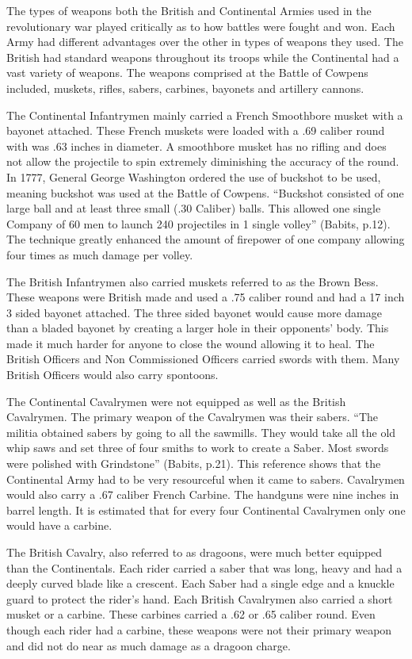 The types of weapons both the British and Continental Armies used in the
revolutionary war played critically as to how battles were fought and won.  Each
Army had different advantages over the other in types of weapons they used.  The
British had standard weapons throughout its troops while the Continental had a
vast variety of weapons. The weapons comprised at the Battle of Cowpens
included, muskets, rifles, sabers, carbines, bayonets and artillery cannons.  

The Continental Infantrymen mainly carried a French Smoothbore musket with a
bayonet attached.  These French muskets were loaded with a .69 caliber round
with was .63 inches in diameter.  A smoothbore musket has no rifling and does
not allow the projectile to spin extremely diminishing the accuracy of the
round.  In 1777, General George Washington ordered the use of buckshot to be
used, meaning buckshot was used at the Battle of Cowpens.  “Buckshot consisted
of one large ball and at least three small (.30 Caliber) balls.  This allowed
one single Company of 60 men to launch 240 projectiles in 1 single volley”
(Babits, p.12).  The technique greatly enhanced the amount of firepower of one
company allowing four times as much damage per volley.

The British Infantrymen also carried muskets referred to as the Brown Bess.
These weapons were British made and used a .75 caliber round and had a 17 inch 3
sided bayonet attached.  The three sided bayonet would cause more damage than a
bladed bayonet by creating a larger hole in their opponents’ body.  This made it
much harder for anyone to close the wound allowing it to heal.  The British
Officers and Non Commissioned Officers carried swords with them.  Many British
Officers would also carry spontoons.

The Continental Cavalrymen were not equipped as well as the British Cavalrymen.
The primary weapon of the Cavalrymen was their sabers.  “The militia obtained
sabers by going to all the sawmills.  They would take all the old whip saws and
set three of four smiths to work to create a Saber.  Most swords were polished
with Grindstone” (Babits, p.21).  This reference shows that the Continental Army
had to be very resourceful when it came to sabers.  Cavalrymen would also carry
a .67 caliber French Carbine.  The handguns were nine inches in barrel length.
It is estimated that for every four Continental Cavalrymen only one would have a
carbine.

The British Cavalry, also referred to as dragoons, were much better equipped
than the Continentals.  Each rider carried a saber that was long, heavy and had
a deeply curved blade like a crescent.  Each Saber had a single edge and a
knuckle guard to protect the rider’s hand.  Each British Cavalrymen also carried
a short musket or a carbine.  These carbines carried a .62 or .65 caliber round.
Even though each rider had a carbine, these weapons were not their primary
weapon and did not do near as much damage as a dragoon charge.

